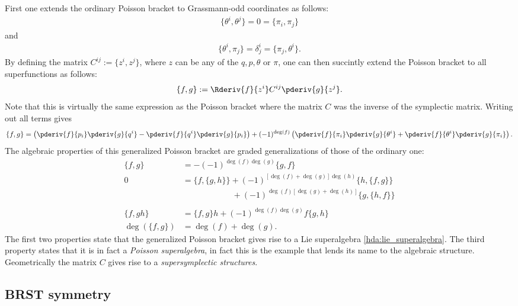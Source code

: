     First one extends the ordinary Poisson bracket to Grassmann-odd coordinates as follows:
    \begin{gather}
        \{\theta^i,\theta^j\} = 0 = \{\pi_i,\pi_j\}
    \end{gather}
    and
    \begin{gather}
        \{\theta^i,\pi_j\} = \delta^i_j = \{\pi_j,\theta^i\}.
    \end{gather}
    By defining the matrix $C^{ij} := \{z^i,z^j\}$, where $z$ can be any of the $q,p,\theta$ or $\pi$, one can then succintly extend the Poisson bracket to all superfunctions as follows:
    \begin{gather}
        \{f,g\} := \Rderiv{f}{z^i}C^{ij}\pderiv{g}{z^j}.
    \end{gather}
    Note that this is virtually the same expression as the Poisson bracket where the matrix $C$ was the inverse of the symplectic matrix. Writing out all terms gives
    \begin{gather}
        \{f,g\} = \left(\pderiv{f}{p_i}\pderiv{g}{q^i}-\pderiv{f}{q^i}\pderiv{g}{p_i}\right) + (-1)^{\deg(f)}\left(\pderiv{f}{\pi_i}\pderiv{g}{\theta^i} + \pderiv{f}{\theta^i}\pderiv{g}{\pi_i}\right).
    \end{gather}
    The algebraic properties of this generalized Poisson bracket are graded generalizations of those of the ordinary one:
    \begin{align}
        \{f,g\} &= -(-1)^{\deg(f)\deg(g)}\{g,f\}\\
        0 &= \{f,\{g,h\}\} + (-1)^{[\deg(f)+\deg(g)]\deg(h)}\{h,\{f,g\}\}\nonumber\\
        &\ \phantom{= \{f,\{g,h\}\} } + (-1)^{\deg(f)[\deg(g)+\deg(h)]}\{g,\{h,f\}\}\\\nonumber\\
        \{f,gh\} &= \{f,g\}h + (-1)^{\deg(f)\deg(g)}f\{g,h\}\\
        \deg(\{f,g\}) &= \deg(f)+\deg(g).
    \end{align}
    The first two properties state that the generalized Poisson bracket gives rise to a Lie superalgebra \ref{hda:lie_superalgebra}. The third property states that it is in fact a \textit{Poisson superalgebra}, in fact this is the example that lends its name to the algebraic structure. Geometrically the matrix $C$ gives rise to a \textit{supersymplectic structures}.

\subsection{BRST symmetry}\label{section:classical_brst}

